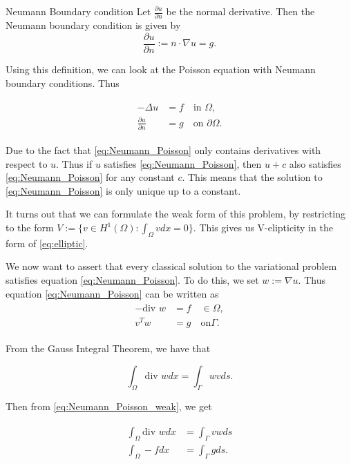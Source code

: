 

\begin{defn}{Neumann Boundary condition}
    Let $\frac{\partial u}{\partial n}$ be the normal derivative. Then the Neumann boundary condition is given by
    \begin{equation}
        \frac{\partial u}{\partial n} := n\cdot \nabla u = g.
    \end{equation}
\end{defn}

Using this definition, we can look at the Poisson equation with Neumann boundary conditions. Thus

\begin{align}
\label{eq:Neumann_Poisson}
\begin{split}
    -\Delta u &= f \quad \text{in } \Omega, \\
    \frac{\partial u}{\partial n} &= g \quad \text{on } \partial \Omega.
\end{split}
\end{align}

Due to the fact that \ref{eq:Neumann_Poisson} only contains derivatives with respect to $u$. 
Thus if $u$ satisfies \ref{eq:Neumann_Poisson}, then $u + c$ also satisfies \ref{eq:Neumann_Poisson} for any constant $c$.
This means that the solution to \ref{eq:Neumann_Poisson} is only unique up to a constant.

It turns out that we can formulate the weak form of this problem, by restricting to the form $V:=\{v\in H^1(\Omega):\int_{\Omega}vdx=0\}.$
This gives us V-elipticity in the form of \ref{eq:elliptic}. 

We now want to assert that every classical solution to the variational problem satisfies equation \ref{eq:Neumann_Poisson}.
To do this, we set $w:=\nabla u$. Thus equation \ref*{eq:Neumann_Poisson} can be written as
\begin{align}\label{eq:Neumann_Poisson_weak}
\begin{split}
    -\text{div } w &= f \quad \in \Omega, \\
    v^Tw &= g \quad \text{on} \Gamma.
\end{split}    
\end{align}

From the Gauss Integral Theorem, we have that

\[\int_{\Omega} \text{div } w dx = \int_{\Gamma} wv ds.\]

Then from \ref{eq:Neumann_Poisson_weak}, we get

\begin{align}
\begin{split}
\int_{\Omega} \text{div } w dx &= \int_{\Gamma} vw ds \\
\int_{\Omega} -f dx &= \int_{\Gamma} g ds.
\end{split}
\end{align}


